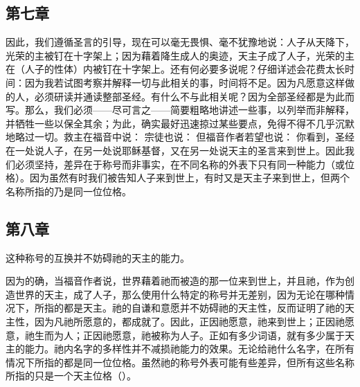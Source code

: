 
\subsection{第七章}

\par

因此，我们遵循圣言的引导，现在可以毫无畏惧、毫不犹豫地说：人子从天降下，光荣的主被钉在十字架上；因为藉着降生成人的奥迹，天主子成了人子，光荣的主在（人子的性体）内被钉在十字架上。还有何必要多说呢？仔细详述会花费太长时间：因为我若试图考察并解释一切与此相关的事，时间将不足。因为凡愿意这样做的人，必须研读并通读整部圣经。有什么不与此相关呢？因为全部圣经都是为此而写。那么，我们必须——尽可言之——简要粗略地讲述一些事，以列举而非解释，并牺牲一些以保全其余；为此，确实最好迅速掠过某些要点，免得不得不几乎沉默地略过一切。救主在福音中说： 宗徒也说： 但福音作者若望也说： 你看到，圣经在一处说人子，在另一处说耶稣基督，又在另一处说天主的圣言来到世上。因此我们必须坚持，差异在于称号而非事实，在不同名称的外表下只有同一种能力（或位格）。因为虽然有时我们被告知人子来到世上，有时又是天主子来到世上，但两个名称所指的乃是同一位位格。\par


\subsection{第八章}

这种称号的互换并不妨碍祂的天主的能力。\par

因为的确，当福音作者说，世界藉着祂而被造的那一位来到世上，并且祂，作为创造世界的天主，成了人子，那么使用什么特定的称号并无差别，因为无论在哪种情况下，所指的都是天主。祂的自谦和意愿并不妨碍祂的天主性，反而证明了祂的天主性，因为凡祂所愿意的，都成就了。因此，正因祂愿意，祂来到世上；正因祂愿意，祂生而为人；正因祂愿意，祂被称为人子。正如有多少词语，就有多少属于天主的能力。祂内名字的多样性并不减损祂能力的效果。无论给祂什么名字，在所有情况下所指的都是同一位位格。虽然祂的称号外表可能有些差异，但所有这些名称所指的只是一个天主位格（）。\par


